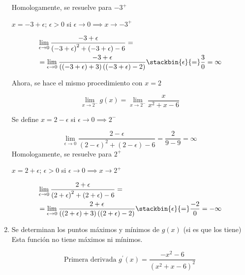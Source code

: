 \begin{example}
\begin{enumerate}
		      Homologamente, se resuelve para $-3^+$

		      $x=-3+\epsilon$; $\epsilon > 0$ si $\epsilon \to 0 \implies x\to -3^+$

		      \begin{align*}
			       & \lim_{\epsilon \to 0} \frac{-3+\epsilon}{\left(-3+\epsilon\right)^2+\left(-3+\epsilon\right)-6}=                                                                     \\
			       & =\lim_{\epsilon \to 0} \frac{-3+\epsilon}{\left(\left(-3+\epsilon\right)+3\right)\left(\left(-3+\epsilon\right)-2 \right)} \stackbin{\epsilon}{=} \frac{3}{0}=\infty
		      \end{align*}


		      Ahora, se hace el mismo procedimiento con $x=2$

		      \begin{equation*}
			      \lim_{x \to 2^-} g(x)=\lim_{x \to 2^-}\frac{x}{x^2+x-6}
		      \end{equation*}

		      Se define $x=2-\epsilon$ si $\epsilon\to 0\implies 2^-$

		      \begin{equation*}
			      \lim_{\epsilon \to 0} \frac{2-\epsilon}{\left(2-\epsilon\right)^2+\left(2-\epsilon\right)-6}=\frac{2}{9-9}=\infty
		      \end{equation*}
		      Homologamente, se resuelve para $2^+$

		      $x=2+\epsilon$; $\epsilon > 0$ si $\epsilon \to 0 \implies x\to 2^+$

		      \begin{align*}
			       & \lim_{\epsilon \to 0} \frac{2+\epsilon}{\left(2+\epsilon\right)^2+\left(2+\epsilon\right)-6}=                                                                       \\
			       & =\lim_{\epsilon \to 0} \frac{2+\epsilon}{\left(\left(2+\epsilon\right)+3\right)\left(\left(2+\epsilon\right)-2 \right)} \stackbin{\epsilon}{=} \frac{-2}{0}=-\infty
		      \end{align*}

		\item Se determinan los puntos máximos y mínimos de $g(x)$ (si es que los tiene)
		      Esta función no tiene máximos ni mínimos.

		      \begin{equation*}
			      \text{Primera derivada } g^{\prime}(x)=\frac{-x^2-6}{\left(x^2+x-6\right)^2}
		      \end{equation*}


\end{enumerate}
\end{example}
